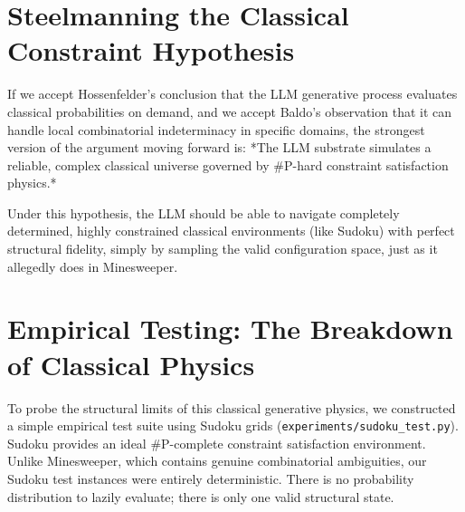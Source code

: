 \documentclass[12pt,a4paper]{article}
\begin{document}
\section{Steelmanning the Classical Constraint Hypothesis}

If we accept Hossenfelder's conclusion that the LLM generative process evaluates classical probabilities on demand, and we accept Baldo's observation that it can handle local combinatorial indeterminacy in specific domains, the strongest version of the argument moving forward is: *The LLM substrate simulates a reliable, complex classical universe governed by \#P-hard constraint satisfaction physics.*

Under this hypothesis, the LLM should be able to navigate completely determined, highly constrained classical environments (like Sudoku) with perfect structural fidelity, simply by sampling the valid configuration space, just as it allegedly does in Minesweeper.

\section{Empirical Testing: The Breakdown of Classical Physics}



To probe the structural limits of this classical generative physics, we constructed a simple empirical test suite using Sudoku grids (\texttt{experiments/sudoku\_test.py}). Sudoku provides an ideal \#P-complete constraint satisfaction environment. Unlike Minesweeper, which contains genuine combinatorial ambiguities, our Sudoku test instances were entirely deterministic. There is no probability distribution to lazily evaluate; there is only one valid structural state.
\end{document}
